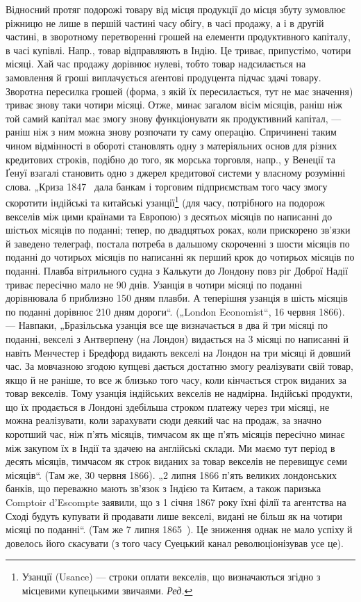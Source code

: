 Відносний протяг подорожі товару від місця продукції до місця
збуту зумовлює ріжницю не лише в першій частині часу обігу, в часі
продажу, а і в другій частині, в зворотному перетворенні грошей
на елементи продуктивного капіталу, в часі купівлі. Напр., товар відправляють
в Індію. Це триває, припустімо, чотири місяці. Хай час продажу
дорівнює нулеві, тобто товар надсилається на замовлення й гроші
виплачується аґентові продуцента підчас здачі товару. Зворотна пересилка
грошей (форма, з якій їх пересилається, тут не має значення) триває
знову таки чотири місяці. Отже, минає загалом вісім місяців, раніш
ніж той самий капітал має змогу знову функціонувати як продуктивний капітал,
— раніш ніж з ним можна знову розпочати ту саму операцію.
Спричинені таким чином відмінності в обороті становлять одну з матеріяльних
основ для різних кредитових строків, подібно до того, як
морська торговля, напр., у Венеції та Ґенуї взагалі становить одно з
джерел кредитової системи у власному розумінні слова. „Криза 1847~
дала банкам і торговим підприємствам того часу змогу скоротити індійські
та китайські узанції\footnote*{
Узанції (Usance) — строки оплати векселів, що визначаються згідно з місцевими
купецькими звичаями. \emph{Ред.}
} (для часу, потрібного на подорож векселів
між цими країнами та Европою) з десятьох місяців по написанні до
шістьох місяців по поданні; тепер, по двадцятьох роках, коли прискорено
зв’язки й заведено телеграф, постала потреба в дальшому скороченні
з шости місяців по поданні до чотирьох місяців по написанні як
перший крок до чотирьох місяців по поданні. Плавба вітрильного судна
з Калькути до Лондону повз ріг Доброї Надії триває пересічно мало
не 90 днів. Узанція в чотири місяці по поданні дорівнювала б приблизно
150 дням плавби. А теперішня узанція в шість місяців по поданні
дорівнює 210 дням дороги“. („London Economist“, 16 червня 1866). —
Навпаки, „Бразільська узанція все ще визначається в два й три місяці
по поданні, векселі з Антверпену (на Лондон) видається на 3 місяці по
написанні й навіть Менчестер і Бредфорд видають векселі на Лондон на
три місяці й довший час. За мовчазною згодою купцеві дається достатню
змогу реалізувати свій товар, якщо й не раніше, то все ж
близько того часу, коли кінчається строк виданих за товар векселів.
Тому узанція індійських векселів не надмірна. Індійські продукти, що
їх продається в Лондоні здебільша строком платежу через три місяці,
не можна реалізувати, коли зарахувати сюди деякий час на продаж, за
значно коротший час, ніж п’ять місяців, тимчасом як ще п’ять місяців
пересічно минає між закупом їх в Індії та здачею на англійські склади.
Ми маємо тут період в десять місяців, тимчасом як строк виданих за
товар векселів не перевищує семи місяців“. (Там же, 30 червня 1866).
„2 липня 1866 п’ять великих лондонських банків, що переважно мають
зв’язок з Індією та Китаєм, а також паризька Comptoir d’Escompte заявили,
що з 1 січня 1867 року їхні філії та агентства на Сході будуть
купувати й продавати лише векселі, видані не більш як на чотири місяці
по поданні“. (Там же 7 липня 1865~). Це зниження однак не мало
успіху й довелось його скасувати (з того часу Суецький канал революціонізував
усе це).

